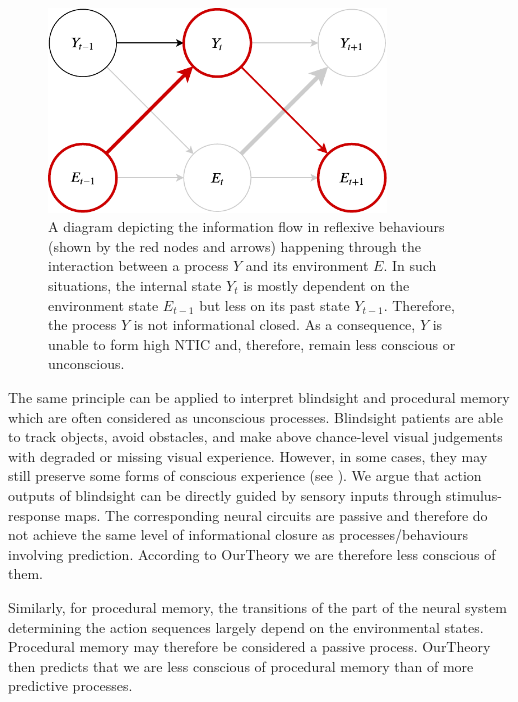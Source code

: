\documentclass[utf8]{article}
\begin{document}
        		\begin{figure}[H]
        			\includegraphics[width=0.8\textwidth]{WritingMaterials/Fig_Reflexive/Reflexive.pdf}
        			\caption{
        			    A diagram depicting the information flow in reflexive behaviours (shown by the red nodes and arrows) happening through the interaction between a process $Y$ and its environment $E$. In such situations, the internal state $Y_t$ is mostly dependent on the environment state $E_{t-1}$ but less on its past state $Y_{t-1}$. Therefore, the process $Y$ is not informational closed. As a  consequence, $Y$ is unable to form high NTIC and, therefore, remain less conscious or unconscious. 
        			    }
        			\label{fig:reflexive}
        		\end{figure}  
        		
        		The same principle can be applied to interpret blindsight \citep{humphrey1999history, humphrey1974vision, Humphrey1970} and procedural memory \citep{doyon2009contributions, ashby2010cortical} which are often considered as unconscious processes.
        		Blindsight patients are able to track objects, avoid obstacles, and make above chance-level visual judgements with degraded or missing visual experience. However, in some cases, they may still preserve some forms of conscious experience (see \cite{overgaard2011visual, mazzi2016blind}). We argue that action outputs of blindsight can be directly guided by sensory inputs through stimulus-response maps. The corresponding neural circuits are passive and therefore do not achieve the same level of informational closure as processes/behaviours involving prediction. According to \ac{OurTheory} we are therefore less conscious of them. 
        		
        		Similarly, for procedural memory, the transitions of the part of the neural system determining the action sequences largely depend on the  environmental states. Procedural memory may therefore be considered a passive process. \ac{OurTheory} then predicts that we are less conscious of procedural memory than of more predictive processes. 
        		
\end{document}
